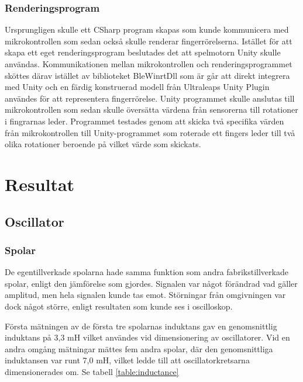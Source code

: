 \documentclass[a4paper]{article}
\begin{document}
\begin{sloppypar}
    \subsubsection{Renderingsprogram}
    Ursprungligen skulle ett CSharp program skapas som kunde kommunicera med mikrokontrollen som sedan också skulle renderar fingerrörelserna.
    Istället för att skapa ett eget renderingsprogram beslutades det att spelmotorn Unity skulle användas.
    Kommunikationen mellan mikrokontrollen och renderingsprogrammet sköttes därav istället av biblioteket BleWinrtDll som är går att direkt integrera med Unity
    och en färdig konstruerad modell från Ultraleaps Unity Plugin användes för att representera fingerrörelse.
    Unity programmet skulle anslutas till mikrokontrollen som sedan skulle översätta värdena från sensorerna till rotationer i fingrarnas leder.
    Programmet testades genom att skicka två specifika värden från mikrokontrollen till Unity-programmet som roterade ett fingers leder till två olika rotationer beroende på vilket värde som skickats.

    \section{Resultat}

    \subsection{Oscillator}
    \subsubsection{Spolar}
    De egentillverkade spolarna hade samma funktion som andra fabrikstillverkade spolar, enligt den jämförelse som gjordes.
    Signalen var något förändrad vad gäller amplitud, men hela signalen kunde tas emot.
    Störningar från omgivningen var dock något större, enligt resultaten som kunde ses i oscilloskop.

    Första mätningen av de första tre spolarnas induktans gav en genomsnittlig induktans på 3,3 mH vilket användes vid dimensionering av oscillatorer.
    Vid en andra omgång mätningar mättes fem andra spolar, där den genomsnittliga induktansen var runt 7,0 mH, vilket ledde till att oscillatorkretsarna dimensionerades om. Se tabell \ref{table:inductance}


\end{sloppypar}
\end{document}
